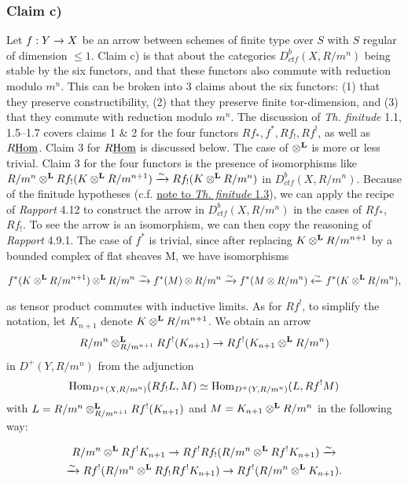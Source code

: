 \documentclass[deligne.tex]{subfiles}
\begin{document}
\subsubsection*{Claim c)}\label{weilII:1.1.2c}
Let $f:Y\rightarrow X$ be an arrow between schemes of finite type over $S$
with $S$ regular of dimension $\leq1$.
Claim c) is that about the categories
$D_{ctf}^b(X,R/m^n)$ being stable by the six functors, and that these 
functors also commute with reduction modulo $m^n$.
This can be broken into 3 claims about the six functors: (1) that they 
preserve constructibility, (2) that they preserve finite tor-dimension,
and (3) that they commute with reduction modulo $m^n$.
The discussion of \emph{Th. finitude} 1.1, 1.5–1.7
covers claims 1 \& 2 for the four functors $Rf_*,f^*,Rf_!,Rf^!$, as well
as $R\underline{\operatorname{Hom}}$. Claim 3 for $R\underline{\operatorname{Hom}}$ is discussed below.
The case of $\otimes^{\mathbf{L}}$ is more or less trivial.
Claim 3 for the four functors is the presence of isomorphisms like
$R/m^n\otimes^{\mathbf{L}} Rf_!(K\otimes^{\mathbf{L}} R/m^{n+1})\xrightarrow\sim Rf_!(K\otimes^{\mathbf{L}} R/m^n)$
in $D^b_{ctf}(X,R/m^n)$. Because of the finitude hypotheses
(c.f. \href{thfin:1.3}{note to \emph{Th. finitude} 1.3}), we can apply the
recipe of \emph{Rapport} 4.12 to construct the arrow in
$D^b_{ctf}(X,R/m^n)$ in the cases of $Rf_*$, $Rf_!$.
To see the arrow is an isomorphism, we can then copy the reasoning of
\emph{Rapport} 4.9.1.
The case of $f^*$ is trivial, since after replacing $K\otimes^{\mathbf{L}} R/m^{n+1}$
by a bounded complex of flat sheaves M, we have isomorphisms
\begin{ceqn}\begin{equation*}
	f^*(K\otimes^{\mathbf{L}} R/m^{n+1})\otimes^{\mathbf{L}} R/m^n
	\xrightarrow\sim f^*(M)\otimes R/m^n\xrightarrow\sim f^*(M\otimes R/m^n)
	\xleftarrow\sim f^*(K\otimes^{\mathbf{L}} R/m^n),
\end{equation*}\end{ceqn}
as tensor product commutes with inductive limits.
As for $Rf^!$, to simplify the notation, let $K_{n+1}$ denote
$K\otimes^{\mathbf{L}} R/m^{n+1}$. We obtain an arrow
\begin{equation*}
	R/m^n\otimes^{\mathbf{L}}_{R/m^{n+1}}Rf^!(K_{n+1})\rightarrow
	Rf^!(K_{n+1}\otimes^{\mathbf{L}} R/m^n)
\end{equation*}
in $D^+(Y,R/m^n)$ from the adjunction
\begin{equation*}
	\operatorname{Hom}_{D^+(X,R/m^n)}(Rf_!L,M)\simeq \operatorname{Hom}_{D^+(Y,R/m^n)}(L,Rf^!M)
\end{equation*}
with $L=R/m^n\otimes^{\mathbf{L}}_{R/m^{n+1}}Rf^!(K_{n+1})$ and
$M=K_{n+1}\otimes^{\mathbf{L}} R/m^n$ in the following way:
\begin{ceqn}\begin{multline*}
	R/m^n\otimes^{\mathbf{L}} Rf^!K_{n+1}\rightarrow Rf^!Rf_!(R/m^n\otimes^{\mathbf{L}} Rf^!K_{n+1})
	\xrightarrow\sim \\
	\xrightarrow\sim Rf^!(R/m^n\otimes^{\mathbf{L}} Rf_!Rf^!K_{n+1})
	\rightarrow Rf^!(R/m^n\otimes^{\mathbf{L}} K_{n+1}).
\end{multline*}\end{ceqn}
\end{document}
